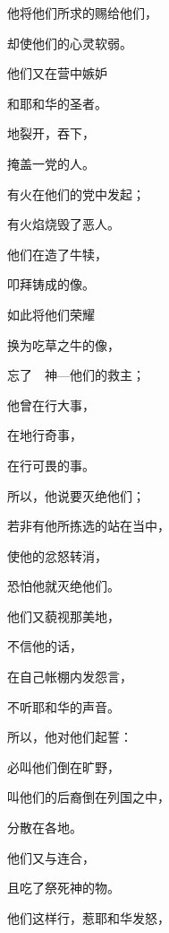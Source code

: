 {\par }{\Q {}他将他们所求的赐给他们，
\par }{\Q 却使他们的心灵软弱。
\par }{\BB \par }{\Q {}他们又在营中嫉妒{}
\par }{\Q 和耶和华的圣者{}。
\par }{\Q {}地裂开，吞下{}，
\par }{\Q 掩盖{}一党的人。
\par }{\Q {}有火在他们的党中发起；
\par }{\Q 有火焰烧毁了恶人。
\par }{\BB \par }{\Q {}他们在{}造了牛犊，
\par }{\Q 叩拜铸成的像。
\par }{\Q {}如此将他们荣耀{}
\par }{\Q 换为吃草之牛的像，
\par }{\Q {}忘了　神—他们的救主；
\par }{\Q 他曾在{}行大事，
\par }{\Q {}在{}地行奇事，
\par }{\Q 在{}行可畏的事。
\par }{\Q {}所以，他说要灭绝他们；
\par }{\Q 若非有他所拣选的{}站在当中，
\par }{\Q 使他的忿怒转消，
\par }{\Q 恐怕他就灭绝他们。
\par }{\BB \par }{\Q {}他们又藐视那美地，
\par }{\Q 不信他的话，
\par }{\Q {}在自己帐棚内发怨言，
\par }{\Q 不听耶和华的声音。
\par }{\Q {}所以，他对他们起誓：
\par }{\Q 必叫他们倒在旷野，
\par }{\Q {}叫他们的后裔倒在列国之中，
\par }{\Q 分散在各地。
\par }{\BB \par }{\Q {}他们又与{}连合，
\par }{\Q 且吃了祭死神的物。
\par }{\Q {}他们这样行，惹耶和华发怒，
}
